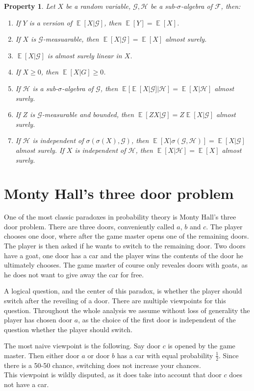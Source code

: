 \documentclass[twoside,a4paper]{article}
\theoremstyle{plain}
\newtheorem{property}[theorem]{Property}
\theoremstyle{definition}
\theoremstyle{remark}
\numberwithin{equation}{section}
\DeclareMathOperator{\E}{\mathbb{E}}
\DeclareMathOperator{\1}{\mathbbm{1}}
\newcommand{\F}{\mathcal{F}}
\renewcommand{\G}{\mathcal{G}}
\renewcommand{\H}{\mathcal{H}}
\begin{document}
\begin{property}\label{property:expcon}
Let $X$ be a random variable, $\G,\H$ be a sub-$\sigma$-algebra of $\F$, then:
\begin{enumerate}
\item If $Y$ is a version of $\E[X|\G]$, then $\E[Y]=\E[X]$.
\item If $X$ is $\G$-measuarable, then $\E[X|\G]=\E[X]$ almost surely.
\item $\E[X|\G]$ is almost surely linear in $X$.
\item If $X\geq 0$, then $\E[X|G]\geq 0$.
\item If $\H$ is a sub-$\sigma$-algebra of $\G$, then $\E[\E[X|\G]|\H]=\E[X|\H]$ almost surely.
\item If $Z$ is $\G$-measurable and bounded, then $\E[ZX|\G]=Z\E[X|\G]$ almost surely.
\item If $\H$ is independent of $\sigma(\sigma(X),\G)$, then $\E[X|\sigma(\G,\H)]=\E[X|\G]$ almost surely. If $X$ is independent of $\H$, then $\E[X|\H]=\E[X]$ almost surely.
\end{enumerate}
\end{property}

\section{Monty Hall's three door problem}
One of the most classic paradoxes in probability theory is Monty Hall's three door problem. There are three doors, conveniently called $a$, $b$ and $c$. The player chooses one door, where after the game master opens one of the remaining doors. The player  is then asked if he wants to switch to the remaining door. Two doors have a goat, one door has a car and the player wins the contents of the door he ultimately chooses. The game master of course only reveales doors with goats, as he does not want to give away the car for free.

A logical question, and the center of this paradox, is whether the player should switch after the reveiling of a door. There are multiple viewpoints for this question. Throughout the whole analysis we assume without loss of generality the player has chosen door $a$, as the choice of the first door is independent of the question whether the player should switch. 

The most naive viewpoint is the following. Say door $c$ is opened by the game master. Then either door $a$ or door $b$ has a car with equal probability $\frac{1}{2}$. Since there is a 50-50 chance, switching does not increase your chances.\\
This viewpoint is wildly disputed, as it does take into account that door $c$ does not have a car.
\end{document}
